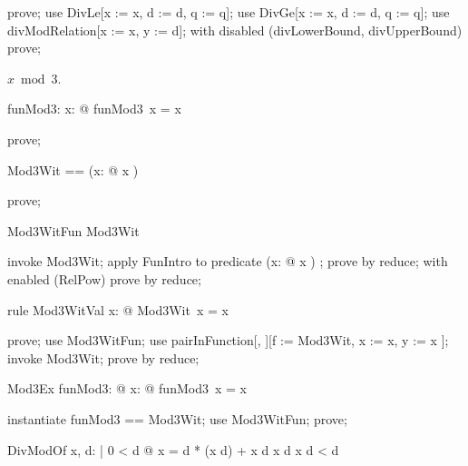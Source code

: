 \documentclass{article}
\begin{document}
\begin{zproof}
prove;
use DivLe[x := x, d := d, q := q];
use DivGe[x := x, d := d, q := q];
use divModRelation[x := x, y := d];
with disabled (divLowerBound, divUpperBound) prove;
\end{zproof}

$x \bmod 3$.

\begin{axdef}
  funMod3: \nat \fun \nat
\where
   \forall x: \nat @ funMod3~x = x 
\end{axdef}

\begin{zproof}
prove;
\end{zproof}

\begin{zed}
  Mod3Wit == (\lambda x: \nat @ x )
\end{zed}

\begin{zproof}
prove;
\end{zproof}

\begin{theorem}{Mod3WitFun}
  Mod3Wit \in \nat \fun \nat
\end{theorem}

\begin{zproof}
invoke Mod3Wit;
apply FunIntro to predicate (\lambda x: \nat @ x ) \in \nat \fun \nat;
prove by reduce;
with enabled (RelPow) prove by reduce;
\end{zproof}

\begin{theorem}{rule Mod3WitVal}
  \forall x: \nat @ Mod3Wit~x = x 
\end{theorem}

\begin{zproof}
prove;
use Mod3WitFun;
use pairInFunction[\nat, \nat][f := Mod3Wit, x := x, y := x ];
invoke Mod3Wit;
prove by reduce;
\end{zproof}

\begin{theorem}{Mod3Ex}
  \exists funMod3: \nat \fun \nat @ \forall x: \nat @ funMod3~x = x 
\end{theorem}

\begin{zproof}
instantiate funMod3 == Mod3Wit;
use Mod3WitFun;
prove;
\end{zproof}

\begin{theorem}{DivModOf}
  \forall x, d: \nat | 0 < d @ x = d * (x \div d) + x \mod d  \leq x \mod d \land x \mod d < d
\end{theorem}
\end{document}
